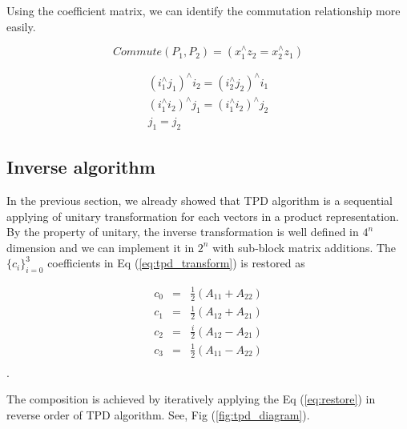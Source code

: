 \documentclass[twocolumn]{article}
\begin{document}
Using the coefficient matrix, we can identify the commutation relationship more easily.

\begin{equation}
    Commute(P_1, P_2) = (x_1^\wedge z_2 = x_2^\wedge z_1) 
\end{equation}

\begin{align}
    (i_1^\wedge j_1)^\wedge i_2 = (i_2^\wedge j_2)^\wedge i_1\\
    (i_1^\wedge i_2)^\wedge j_1 = (i_1^\wedge i_2)^\wedge j_2 \\
    j_1 = j_2
\end{align}



\subsection{Inverse algorithm}

In the previous section, we already showed that TPD algorithm is a sequential 
applying of unitary transformation for each vectors in a product representation.
By the property of unitary, the inverse transformation is well defined 
in $4^n$ dimension and we can implement it in $2^n$ with 
sub-block matrix additions. 
The $\{c_i\}_{i=0}^3$ coefficients in Eq (\ref{eq:tpd_transform}) is restored as 

\begin{equation}
    \label{eq:restore}
    \begin{array}{ccc}
        c_0 &=& \frac{1}{2} (A_{11} + A_{22})\\
        c_1 &=& \frac{1}{2} (A_{12} + A_{21})\\
        c_2 &=& \frac{i}{2} (A_{12} - A_{21})\\
        c_3 &=& \frac{1}{2} (A_{11} - A_{22})\\
    \end{array}
\end{equation}.

The composition is achieved by iteratively applying the Eq (\ref{eq:restore}) in reverse order of TPD algorithm. 
See, Fig (\ref{fig:tpd_diagram}).
\end{document}
